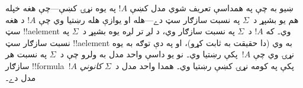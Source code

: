 \documentclass[../../../include/open-logic-section]{subfiles}
\begin{document}
ښيو به چې په همداسې تعريف شوي مدل کښې $!A$ په يوه نړۍ کښې---چې
هغه خپله هم يو بشپړ د~$\Sigma$ په نسبت سازګار سټ دے---هله او
يوازې هله رښتيا وي چې $!A$ د هغه سټ !!a{element} وي۔ که
$!A$ د~$\Sigma$ په نسبت سازګار وي، د لږ تر لږه يوه بشپړ
د~$\Sigma$ په نسبت سازګار سټ !!a{element} به وي (دا حقيقت به
ثابت کړو)، او په دې توګه به يوه نړۍ وي چې $!A$~پکې رښتيا وي۔
نو يو داسې واحد مدل به ولرو چې د~$\Sigma$ په نسبت هر سازګار
!!{formula}~$!A$ پکې په کومه نړۍ کښې رښتيا وي۔ همدا واحد مدل
د~$\Sigma$ \emph{کانوني} مدل دے۔
\end{document}
